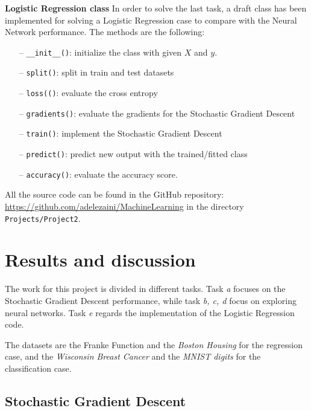 \documentclass[english,notitlepage,reprint,nofootinbib]{revtex4-1}  %
\begin{document}
\textbf{Logistic Regression class}
In order to solve the last task, a draft class has been implemented for solving a Logistic Regression case to compare with the Neural Network performance. The methods are the following:
\begin{itemize}
    \item[–] \texttt{\_\_init\_\_()}: initialize the class with given $X$ and $y$.
    \item[–] \texttt{split()}: split in train and test datasets
    \item[–] \texttt{loss(()}: evaluate the cross entropy
    \item[–] \texttt{gradients()}: evaluate the gradients for the Stochastic Gradient Descent
    \item[–] \texttt{train()}: implement the Stochastic Gradient Descent
    \item[–] \texttt{predict()}: predict new output with the trained/fitted class
    \item[–] \texttt{accuracy()}: evaluate the accuracy score.
\end{itemize}


All the source code can be found in the GitHub repository: \href{https://github.com/adelezaini/MachineLearning/Projects/Project2}{ https://github.com/adelezaini/MachineLearning} in the directory \texttt{Projects/Project2}.


\section{Results and discussion}\label{sec:results}

The work for this project is divided in different tasks. Task \textit{a} focuses on the Stochastic Gradient Descent performance, while task \textit{b, c, d} focus on exploring neural networks. Task \textit{e} regards the implementation of the Logistic Regression code.

The datasets are the {Franke Function} and the \textit{Boston Housing} for the regression case, and the \textit{Wisconsin Breast Cancer} and the \textit{MNIST digits} for the classification case.

\subsection{Stochastic Gradient Descent}
\end{document}
